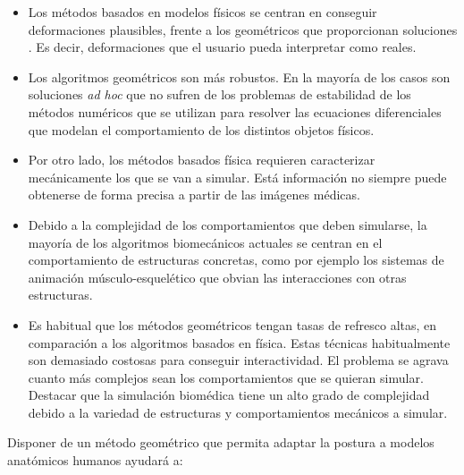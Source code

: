 \begin{itemize}
\item Los métodos basados en modelos físicos se centran en conseguir deformaciones plausibles, frente a los geométricos que proporcionan soluciones . Es decir, deformaciones que el usuario pueda interpretar como reales. 


\item Los algoritmos geométricos son más robustos. En la mayoría de los casos son soluciones \emph{ad hoc} que no sufren de los problemas de estabilidad de los métodos numéricos que se utilizan para resolver las ecuaciones diferenciales que modelan el comportamiento de los distintos objetos físicos. %

\item Por otro lado, los métodos basados física requieren caracterizar mecánicamente los  que se van a simular. Está información no siempre puede obtenerse de forma precisa a partir de las imágenes médicas.

\item Debido a la complejidad de los comportamientos que deben simularse, la mayoría de los algoritmos biomecánicos actuales se centran en el comportamiento de estructuras concretas, como por ejemplo los sistemas de animación músculo-esquelético que obvian las interacciones con otras estructuras. 

\item Es habitual que los métodos geométricos tengan tasas de refresco altas, en comparación a los algoritmos basados en física. Estas técnicas habitualmente son demasiado costosas para conseguir interactividad. El problema se agrava  cuanto más complejos sean los comportamientos que se quieran simular. Destacar que la simulación biomédica tiene un alto grado de complejidad debido a la variedad de estructuras y comportamientos mecánicos a simular.

\end{itemize}

Disponer de un método geométrico que permita adaptar la postura a modelos anatómicos humanos ayudará a:


